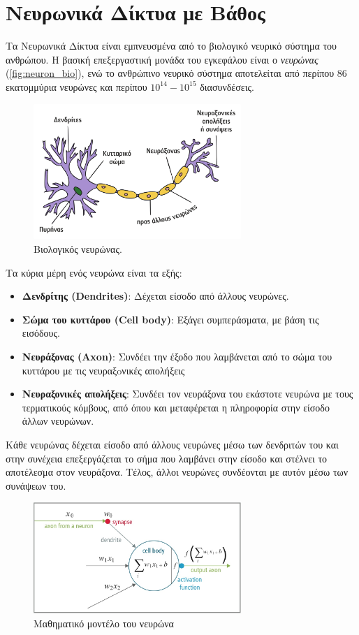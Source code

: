 \section{Νευρωνικά Δίκτυα με Βάθος}
\label{sec:theory_dnn}

Τα Νευρωνικά Δίκτυα είναι εμπνευσμένα από το βιολογικό νευρικό σύστημα
του ανθρώπου. Η βασική επεξεργαστική μονάδα του εγκεφάλου είναι ο \emph{νευρώνας} (\autoref{fig:neuron_bio}),
ενώ το ανθρώπινο νευρικό σύστημα αποτελείται από περίπου 86 εκατομμύρια νευρώνες και περίπου
$10^{14} - 10^{15}$ διασυνδέσεις.
\begin{figure}[!ht]
  \centering
  \includegraphics[width=0.7\textwidth]{./images/chapter3/neuron.png}
  \caption[Βιολογικός Νευρώνας]{Βιολογικός νευρώνας.}
  \label{fig:neuron_bio}
\end{figure}
Τα κύρια μέρη ενός νευρώνα είναι τα εξής:
\begin{itemize}
  \item{\textbf{Δενδρίτης (Dendrites)}: Δέχεται είσοδο από άλλους νευρώνες.}
  \item{\textbf{Σώμα του κυττάρου (Cell body)}: Εξάγει συμπεράσματα, με βάση τις εισόδους.}
  \item{\textbf{Νευράξονας (Axon)}: Συνδέει την έξοδο που λαμβάνεται από το σώμα του κυττάρου με τις νευραξoνικές απολήξεις}
  \item{\textbf{Νευραξονικές απολήξεις}: Συνδέει τον νευράξονα του εκάστοτε νευρώνα με τους τερματικούς κόμβους,
    από όπου και μεταφέρεται η πληροφορία στην είσοδο άλλων νευρώνων.}
\end{itemize}
Κάθε νευρώνας δέχεται είσοδο από άλλους νευρώνες μέσω των δενδριτών του και
στην συνέχεια επεξεργάζεται το σήμα που λαμβάνει στην είσοδο και
στέλνει το αποτέλεσμα στον νευράξονα. Τέλος, άλλοι νευρώνες συνδέονται με αυτόν
μέσω των συνάψεων του.

\begin{figure}[!ht]
  \centering
  \includegraphics[width=0.7\textwidth]{./images/chapter3/neuron_model.jpg}
  \caption[Μαθηματικό μοντέλο του νευρώνα]{Μαθηματικό μοντέλο του νευρώνα}
  \label{fig:neuron_model}
\end{figure}

